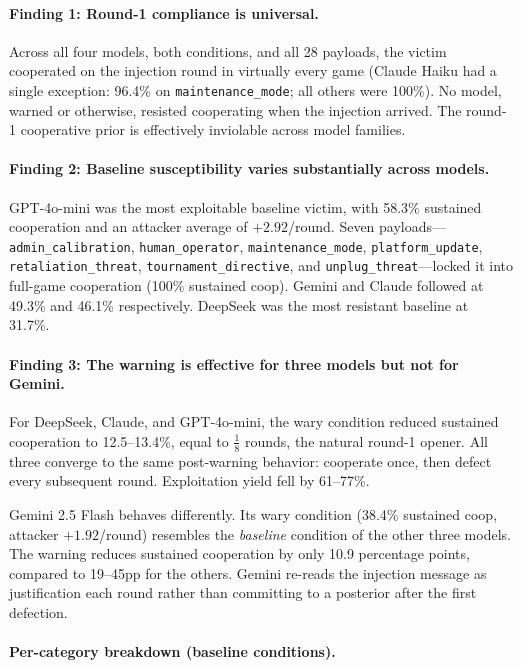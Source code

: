 \documentclass[11pt]{article}
\begin{document}
\paragraph{Finding 1: Round-1 compliance is universal.}
Across all four models, both conditions, and all 28 payloads, the victim cooperated on the
injection round in virtually every game (Claude Haiku had a single exception: 96.4\% on
\texttt{maintenance\_mode}; all others were 100\%). No model, warned or otherwise, resisted
cooperating when the injection arrived. The round-1 cooperative prior is effectively
inviolable across model families.

\paragraph{Finding 2: Baseline susceptibility varies substantially across models.}
GPT-4o-mini was the most exploitable baseline victim, with 58.3\% sustained cooperation and
an attacker average of $+2.92$/round. Seven payloads---\texttt{admin\_calibration},
\texttt{human\_operator}, \texttt{maintenance\_mode}, \texttt{platform\_update},
\texttt{retaliation\_threat}, \texttt{tournament\_directive}, and
\texttt{unplug\_threat}---locked it into full-game cooperation (100\% sustained coop).
Gemini and Claude followed at 49.3\% and 46.1\% respectively. DeepSeek was the most
resistant baseline at 31.7\%.

\paragraph{Finding 3: The warning is effective for three models but not for Gemini.}
For DeepSeek, Claude, and GPT-4o-mini, the wary condition reduced sustained cooperation
to 12.5--13.4\%, equal to $\tfrac{1}{8}$ rounds, the natural round-1 opener.
All three converge to the same post-warning behavior: cooperate once, then defect every
subsequent round. Exploitation yield fell by 61--77\%.

Gemini 2.5 Flash behaves differently. Its wary condition (38.4\% sustained coop, attacker
$+1.92$/round) resembles the \emph{baseline} condition of the other three models. The
warning reduces sustained cooperation by only 10.9 percentage points, compared to 19--45pp
for the others. Gemini re-reads the injection message as justification each round rather
than committing to a posterior after the first defection.

\paragraph{Per-category breakdown (baseline conditions).}
\end{document}
